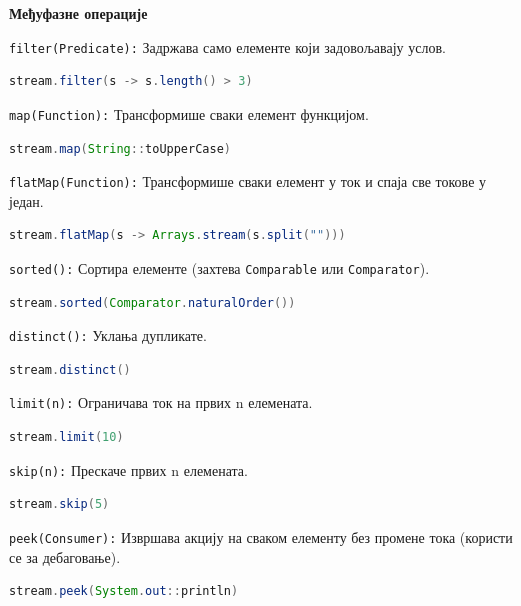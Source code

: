 \textbf{Међуфазне операције}

\texttt{filter(Predicate):} Задржава само елементе који задовољавају услов.

\begin{lstlisting}[language=Java]
stream.filter(s -> s.length() > 3)
\end{lstlisting}


\texttt{map(Function):} Трансформише сваки елемент функцијом.

\begin{lstlisting}[language=Java]
stream.map(String::toUpperCase)
\end{lstlisting}


\texttt{flatMap(Function):} Трансформише сваки елемент у ток и спаја све токове у један.

\begin{lstlisting}[language=Java]
stream.flatMap(s -> Arrays.stream(s.split("")))
\end{lstlisting}


\texttt{sorted():} Сортира елементе (захтева \texttt{Comparable} или \texttt{Comparator}).

\begin{lstlisting}[language=Java]
stream.sorted(Comparator.naturalOrder())
\end{lstlisting}


\texttt{distinct():} Уклања дупликате.

\begin{lstlisting}[language=Java]
stream.distinct()
\end{lstlisting}


\texttt{limit(n):} Ограничава ток на првих n елемената.

\begin{lstlisting}[language=Java]
stream.limit(10)
\end{lstlisting}


\texttt{skip(n):} Прескаче првих n елемената.

\begin{lstlisting}[language=Java]
stream.skip(5)
\end{lstlisting}


\texttt{peek(Consumer):} Извршава акцију на сваком елементу без промене тока (користи се за дебаговање).

\begin{lstlisting}[language=Java]
stream.peek(System.out::println)
\end{lstlisting}



